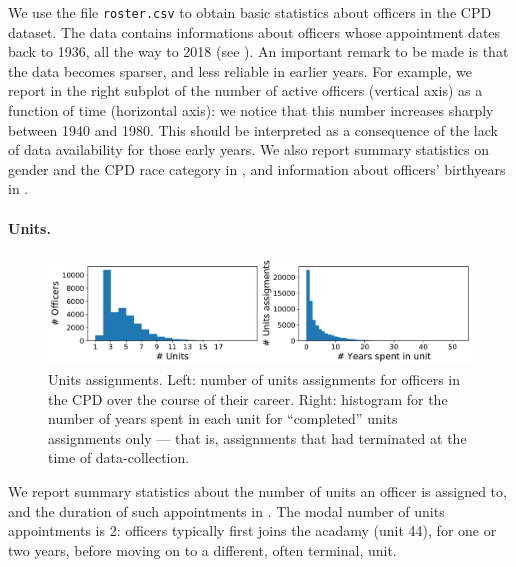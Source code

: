 We use the file \texttt{roster.csv} to obtain basic statistics about officers in the CPD dataset. The data contains informations about officers whose appointment dates back to 1936, all the way to 2018 (see ). An important remark to be made is that the data becomes sparser, and less reliable in earlier years. For example, we report in the right subplot of  the number of active officers (vertical axis) as a function of time (horizontal axis): we notice that this number increases sharply between 1940 and 1980. This should be interpreted as a consequence of the lack of data availability for those early years. We also report summary statistics on gender and the CPD race category in , and information about officers' birthyears in .

\paragraph{Units.} 
\begin{figure}[h] 
	\includegraphics[width=\textwidth]{figs/units_officers} 
	\caption{Units assignments. Left: number of units assignments for officers in the CPD over the course of their career. Right: histogram for the number of years spent in each unit for ``completed'' units assignments only --- that is, assignments that had terminated at the time of data-collection.} \label{fig:units}
\end{figure}


We report summary statistics about the number of units an officer is assigned to, and the duration of such appointments in . The modal number of units appointments is 2: officers typically first joins the acadamy (unit 44), for one or two years, before moving on to a different, often terminal, unit. 
 
